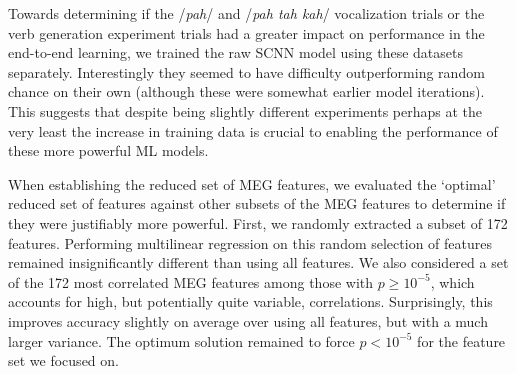 \documentclass[fleqn,10pt]{wlscirep}
\begin{document}
Towards determining if the /{\em pah}/ and /{\em pah tah kah}/ vocalization trials or the verb generation experiment trials had a greater impact on performance in the end-to-end learning, we trained the raw SCNN model using these datasets separately. Interestingly they seemed to have difficulty outperforming random chance on their own (although these were somewhat earlier model iterations). This suggests that despite being slightly different experiments perhaps at the very least the increase in training data is crucial to enabling the performance of these more powerful ML models.

When establishing the reduced set of MEG features, we evaluated the `optimal' reduced set of features against other subsets of the MEG features to determine if they were justifiably more powerful. First, we randomly extracted a subset of 172 features. Performing multilinear regression on this random selection of features remained insignificantly different than using all features. We also considered a set of the 172 most correlated MEG features among those with $p \geq 10^{-5}$, which accounts for high, but potentially quite variable, correlations. Surprisingly, this improves accuracy slightly on average over using all features, but with a much larger variance. The optimum solution remained to force $p<10^{-5}$ for the feature set we focused on. %

\end{document}
